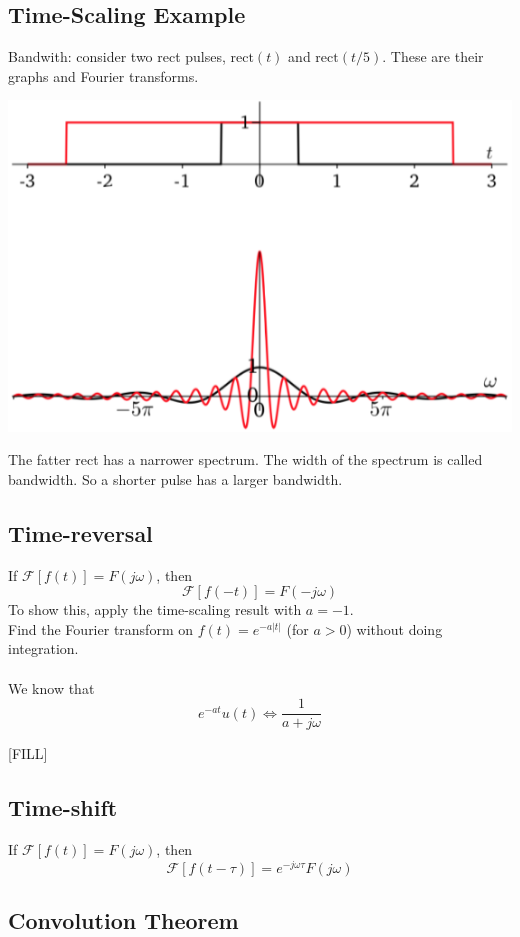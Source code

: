 \documentclass[10pt]{article}
\begin{document}
\subsection*{Time-Scaling Example}
Bandwith: consider two rect pulses, $\text{rect}(t)$ and $\text{rect}(t/5)$.  These are their graphs and Fourier transforms.
\begin{center}
    \includegraphics*[scale=0.8]{W5_6.png}
\end{center}
The fatter rect has a narrower spectrum.  The width of the spectrum is called bandwidth.  So a shorter pulse has a larger bandwidth.
\subsection*{Time-reversal}
If $\mathcal{F}[f(t)] = F(j\omega)$, then
\[\boxed{\mathcal{F}[f(-t)] = F(-j\omega)}\]
To show this, apply the time-scaling result with $a = -1$.\\
Find the Fourier transform on $f(t) = e^{-a|t|}$ (for $a > 0$) without doing integration.\\\\
We know that
\[e^{-at} u(t) \Longleftrightarrow \frac{1}{a + j\omega}\]

[FILL]

\subsection*{Time-shift}
If $\mathcal{F}[f(t)] = F(j\omega)$, then
\[\mathcal{F}[f(t - \tau)] = e^{-j\omega \tau} F(j\omega)\]

\subsection*{Convolution Theorem}
\end{document}
